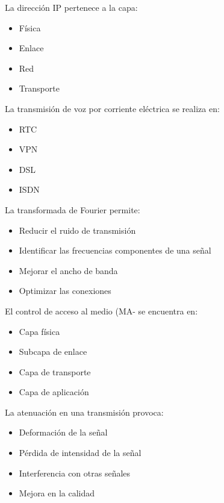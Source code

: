 \documentclass[11pt]{article}
\begin{document}
La dirección IP pertenece a la capa:

\begin{itemize}
\item Física

\item Enlace

\item Red

\item Transporte
\end{itemize}

La transmisión de voz por corriente eléctrica se realiza en:

\begin{itemize}
\item RTC

\item VPN

\item DSL

\item ISDN
\end{itemize}

La transformada de Fourier permite:

\begin{itemize}
\item Reducir el ruido de transmisión

\item Identificar las frecuencias componentes de una señal

\item Mejorar el ancho de banda

\item Optimizar las conexiones
\end{itemize}

El control de acceso al medio (MA- se encuentra en:

\begin{itemize}
\item Capa física

\item Subcapa de enlace

\item Capa de transporte

\item Capa de aplicación
\end{itemize}

La atenuación en una transmisión provoca:

\begin{itemize}
\item Deformación de la señal

\item Pérdida de intensidad de la señal

\item Interferencia con otras señales

\item Mejora en la calidad
\end{itemize}
\end{document}
